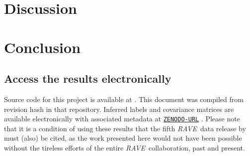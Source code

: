 \documentclass[preprint,trackchanges]{aastex}
\newcommand{\acronym}[1]{{\small{#1}}}
\newcommand{\project}[1]{\textsl{#1}}
\newcommand{\rave}{\project{\acronym{RAVE}}}
\newcommand{\teff}{T_{\mathrm{eff}}}
\newcommand{\logg}{\log g}
\newcommand{\Nstars}{483,330}
\begin{document}



\section{Discussion}
\label{sec:discussion}





\section{Conclusion}
\label{sec:conclusion}



\subsection*{Access the results electronically}

\noindent{}Source code for this project is available at \texttt{\giturl}.
This document was compiled from revision hash \texttt{\githash} in that repository.
Inferred labels and covariance matrices are available electronically with 
associated metadata at \texttt{\url{ZENODO-URL}} \citep{DATA_REPOSITORY}.  
Please note that it is a condition of using these results that the fifth \rave\ 
data release by \citet{Kunder_2016} must (also) be cited, as the work presented 
here would not have been possible without the tireless efforts of the entire 
\rave\ collaboration, past and present.
\end{document}
